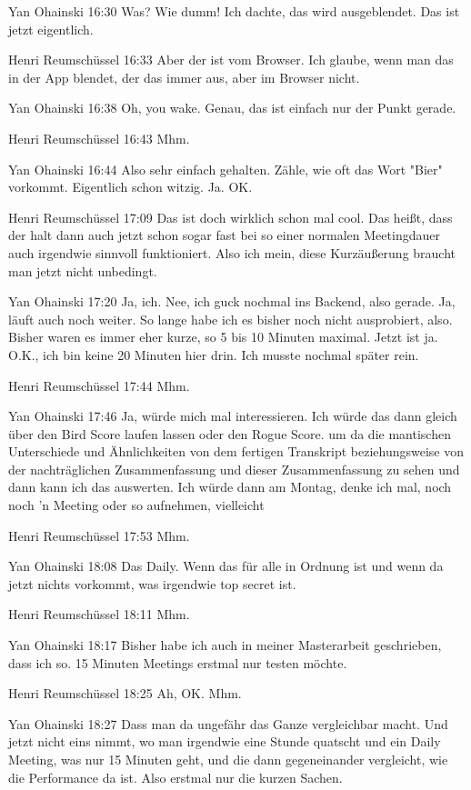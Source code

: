 Yan Ohainski   16:30
Was? Wie dumm! Ich dachte, das wird ausgeblendet. Das ist jetzt eigentlich.

Henri Reumschüssel   16:33
Aber der ist vom Browser. Ich glaube, wenn man das in der App blendet, der das immer aus, aber im Browser nicht.

Yan Ohainski   16:38
Oh, you wake.
Genau, das ist einfach nur der Punkt gerade.

Henri Reumschüssel   16:43
Mhm.

Yan Ohainski   16:44
Also sehr einfach gehalten.
Zähle, wie oft das Wort "Bier" vorkommt.
Eigentlich schon witzig.
Ja.
OK.

Henri Reumschüssel   17:09
Das ist doch wirklich schon mal cool. Das heißt, dass der halt dann auch jetzt schon sogar fast bei so einer normalen Meetingdauer auch irgendwie sinnvoll funktioniert. Also ich mein, diese Kurzäußerung braucht man jetzt nicht unbedingt.

Yan Ohainski   17:20
Ja, ich.
Nee, ich guck nochmal ins Backend, also gerade.
Ja, läuft auch noch weiter. So lange habe ich es bisher noch nicht ausprobiert, also.
Bisher waren es immer eher kurze, so 5 bis 10 Minuten maximal. Jetzt ist ja.
O.K., ich bin keine 20 Minuten hier drin. Ich musste nochmal später rein.

Henri Reumschüssel   17:44
Mhm.

Yan Ohainski   17:46
Ja, würde mich mal interessieren. Ich würde das dann gleich über den Bird Score laufen lassen oder den Rogue Score.
um da die mantischen Unterschiede und Ähnlichkeiten von dem fertigen Transkript beziehungsweise von der nachträglichen Zusammenfassung und dieser Zusammenfassung zu sehen und dann kann ich das auswerten. Ich würde dann am Montag, denke ich mal, noch noch 'n Meeting oder so aufnehmen, vielleicht

Henri Reumschüssel   17:53
Mhm.

Yan Ohainski   18:08
Das Daily.
Wenn das für alle in Ordnung ist und wenn da jetzt nichts vorkommt, was irgendwie top secret ist.

Henri Reumschüssel   18:11
Mhm.

Yan Ohainski   18:17
Bisher habe ich auch in meiner Masterarbeit geschrieben, dass ich so.
15 Minuten Meetings erstmal nur testen möchte.

Henri Reumschüssel   18:25
Ah, OK. Mhm.

Yan Ohainski   18:27
Dass man da ungefähr das Ganze vergleichbar macht.
Und jetzt nicht eins nimmt, wo man irgendwie eine Stunde quatscht und ein Daily Meeting, was nur 15 Minuten geht, und die dann gegeneinander vergleicht, wie die Performance da ist. Also erstmal nur die kurzen Sachen.


